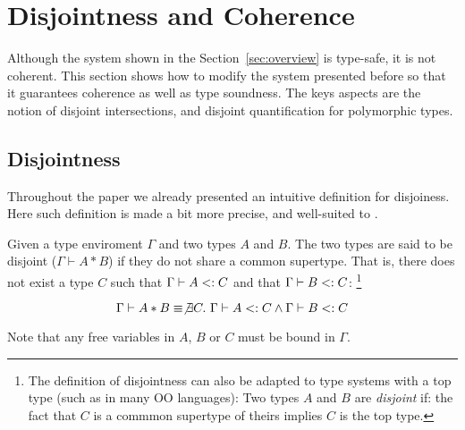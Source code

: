 \section{Disjointness and Coherence}
\label{sec:disjoint}

Although the system shown in the Section~\ref{sec:overview} is
type-safe, it is not coherent. This section shows how to modify the
system presented before so that it guarantees coherence as well as
type soundness. The keys aspects are the notion of disjoint
intersections, and disjoint quantification for polymorphic types.

%
%
%


\subsection{Disjointness} Throughout the paper we already presented an intuitive
definition for disjoiness. Here such definition is made a bit more precise, and
well-suited to \name.

\begin{definition}
  Given a type enviroment $\Gamma$ and two types $A$ and $B$. The two types are said to be disjoint
  ($\Gamma \vdash A * B$) if they do not share a common supertype. That is, there does not exist a
  type $C$ such that $\Gamma \vdash A <: C$
  and that $\Gamma \vdash B <: C$: \footnote{
  The definition of disjointness can also be adapted to type systems with a top
  type (such as \lstinline@Object@ in many OO languages): Two types $A$ and $B$
  are \emph{disjoint} if: the fact that $C$ is a commmon supertype of theirs
  implies $C$ is the top type.
  }

\[\Gamma \vdash A * B \equiv \not\exists C.~\Gamma \vdash A <: C \wedge \Gamma \vdash B <: C\]

\noindent Note that any free variables in $A$, $B$ or $C$ must be bound in $\Gamma$.

\end{definition}

